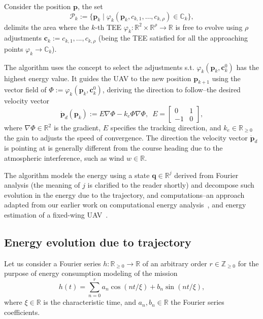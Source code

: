 \documentclass[letterpaper,10pt,conference]{ieeeconf}
\theoremstyle{definition}
\begin{document}
Consider the position $\mathbf{p}$, the set
\begin{equation}\label{eq:area}
  \mathcal{P}_k:=\{\mathbf{p}_k\mid\varphi_k(\mathbf{p}_k,c_{k,1},\dots,c_{k,\rho})\in\mathbb{C}_k\},
\end{equation}
delimits the area where the $k$-th TEE $\varphi_k:\mathbb{R}^2\times\mathbb{R}^{\rho}\rightarrow\mathbb{R}$ is free to evolve using $\rho$ adjustments $\mathbf{c}_k:=c_{k,1},...,c_{k,\rho}$ (being the TEE satisfied for all the approaching points $\varphi_k\rightarrow\mathbb{C}_k$).

The algorithm uses the concept to select the adjustments s.t. $\varphi_k(\mathbf{p}_k,\mathbf{c}_k^0)$ has the highest energy value. It guides the UAV to the new position $\mathbf{p}_{k+1}$ using the vector field of $\varPhi:=\varphi_k(\mathbf{p}_k,\mathbf{c}_k^0)$, deriving the direction to follow--the desired velocity vector
\begin{equation}\label{eq:pd}
  \dot{\mathbf{p}}_d(\mathbf{p}_k):=E\nabla\varPhi-k_e\varPhi\nabla\varPhi,\,\,\,E=\begin{bmatrix}
    0&1\\-1&0
  \end{bmatrix},
\end{equation}
where $\nabla\varPhi\in\mathbb{R}^2$ is the gradient, $E$ specifies the tracking direction, and $k_e\in\mathbb{R}_{\geq 0}$ the gain to adjusts the speed of convergence. The direction the velocity vector $\dot{\mathbf{p}}_d$ is pointing at is generally different from the course heading due to the atmospheric interference, such as wind $w\in\mathbb{R}$.

The algorithm models the energy using a state $\mathbf{q}\in\mathbb{R}^j$ derived from Fourier analysis (the meaning of $j$ is clarified to the reader shortly) and decompose such evolution in the energy due to the trajectory, and computations--an approach adapted from our earlier work on computational energy analysis~\cite{seewald2019coarse, seewald2019component}, and energy estimation of a fixed-wing UAV~\cite{seewald2020mechanical}. 

\subsection{Energy evolution due to trajectory}
\label{sec:energy-model}

Let us consider a Fourier series $h:\mathbb{R}_{\geq 0}\rightarrow\mathbb{R}$ of an arbitrary order $r\in\mathbb{Z}_{\geq 0}$ for the purpose of energy consumption modeling of the mission
\begin{equation}\label{eq:fourier}
  h(t)=\sum_{n=0}^{r}{a_n\cos\left({nt/\xi}\right)+b_n\sin{\left({nt/\xi}\right)}},
\end{equation}
where $\xi\in\mathbb{R}$ is the characteristic time, and $a_n, b_n\in\mathbb{R}$ the Fourier series coefficients.
\end{document}
